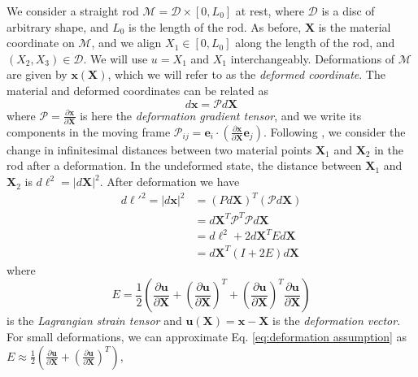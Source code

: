 We consider a straight rod $\mathcal{M}=\mathscr{D} \times [0,L_{0}]$ at rest, where $\mathscr{D}$ is a disc of arbitrary shape, and $L_{0}$ is the length of the rod.
As before, $\mathbf{X}$ is the material coordinate on $\mathcal{M}$, and we align $X_{1}\in[0,L_{0}]$ along the length of the rod, and $(X_{2},X_{3})\in\mathscr{D}$. We will use $u = X_1$ and $X_1$ interchangeably. Deformations of $\mathcal{M}$ are given by $\mathbf{x}(\mathbf{X})$, which we will refer to as the \textit{deformed coordinate}. The material and deformed coordinates can be related as
\begin{equation}
d\mathbf{x}= \mathcal{P} d\mathbf{X}
\end{equation}
where $\mathcal{P} =\frac{\partial\mathbf{x}}{\partial\mathbf{X}}$ is here the \emph{deformation
gradient tensor}, and we write its components in the moving frame $\mathcal{P}_{ij} = \mathbf{e}_i \cdot \left( \frac{\partial\mathbf{x}}{\partial\mathbf{X}} \mathbf{e}_j \right)$. Following \citep{landauTheoryElasticityVolume1986}, we consider
the change in infinitesimal distances between two material points $\mathbf{X}_{1}$ and $\mathbf{X}_{2}$ in the rod after a deformation. In the undeformed
state, the distance between $\mathbf{X}_{1}$ and $\mathbf{X}_{2}$
is $d\ell^{2}=|d\mathbf{X}|^{2}$. After deformation we have
\begin{equation} \label{eq:deformation}
\begin{aligned}d\ell'^{2}=|d\mathbf{x}|^{2} & =(Pd\mathbf{X})^{T}(\mathcal{P} d\mathbf{X})\\
 & =d\mathbf{X}^{T} \mathcal{P}^{T} \mathcal{P} d\mathbf{X}\\
 & =d\ell^{2}+2d\mathbf{X}^{T}Ed\mathbf{X}\\
 & =d\mathbf{X}^{T}(I+2E)d\mathbf{X}
\end{aligned}
\end{equation}
where
\begin{equation} \label{eq:Lagrangian strain tensor}
E=\frac{1}{2}\left(\frac{\partial\mathbf{u}}{\partial\mathbf{X}}+\left(\frac{\partial\mathbf{u}}{\partial\mathbf{X}}\right)^{T}+\left(\frac{\partial\mathbf{u}}{\partial\mathbf{X}}\right)^{T}\frac{\partial\mathbf{u}}{\partial\mathbf{X}}\right) 
\end{equation}
is the \emph{Lagrangian strain tensor} and $\mathbf{u}(\mathbf{X})=\mathbf{x}-\mathbf{X}$ is the \emph{deformation vector}. For small deformations, we can approximate
Eq. \ref{eq:deformation assumption} as $E\approx\frac{1}{2}\left(\frac{\partial\mathbf{u}}{\partial\mathbf{X}}+\left(\frac{\partial\mathbf{u}}{\partial\mathbf{X}}\right)^{T}\right)$,
